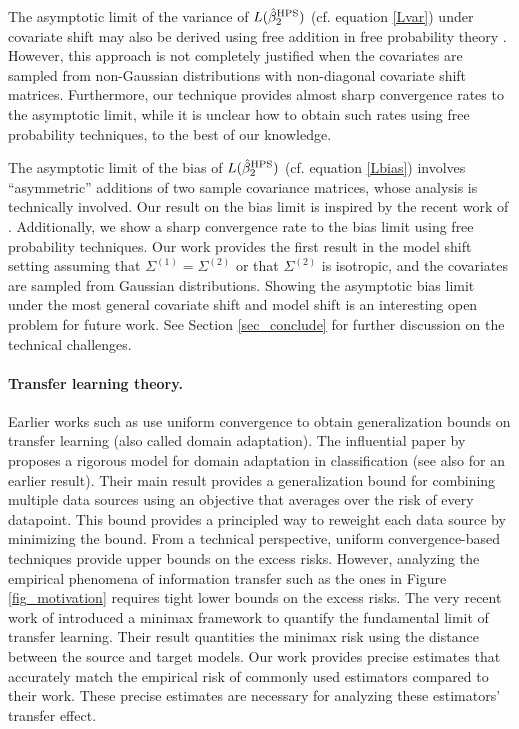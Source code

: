 The asymptotic limit of the variance of $L(\hat{\beta}_2^{\textup{HPS}})$ (cf. equation \eqref{Lvar}) under covariate shift may also be derived using free addition in free probability theory \cite{nica2006lectures}.
However, this approach is not completely justified when the covariates are sampled from non-Gaussian distributions with non-diagonal covariate shift matrices. 
Furthermore, our technique provides almost sharp convergence rates to the asymptotic limit, while it is unclear how to obtain such rates using free probability techniques, to the best of our knowledge.

The asymptotic limit of the bias of $L(\hat{\beta}_2^{\textup{HPS}})$ (cf. equation \eqref{Lbias}) involves ``asymmetric'' additions of two sample covariance matrices, whose analysis is technically involved.
Our result on the bias limit is inspired by the recent work of \citet{BES_free1,BES_free2}.
Additionally, we show a sharp convergence rate to the bias limit using free probability techniques.
Our work provides the first result in the model shift setting assuming that $\Sigma^{(1)} = \Sigma^{(2)}$ or that $\Sigma^{(2)}$ is isotropic, and the covariates are sampled from Gaussian distributions.
Showing the asymptotic bias limit under the most general covariate shift and model shift is an interesting open problem for future work.
See Section \ref{sec_conclude} for further discussion on the technical challenges.

\paragraph{Transfer learning theory.}
Earlier works such as \citet{B00,BS03,M06} use uniform convergence to obtain generalization bounds on transfer learning (also called domain adaptation).
The influential paper by \citet{BBCK10} proposes a rigorous model for domain adaptation in classification (see also \citet{crammer2008learning} for an earlier result).
Their main result provides a generalization bound for combining multiple data sources using an objective that averages over the risk of every datapoint.
This bound provides a principled way to reweight each data source by minimizing the bound.
From a technical perspective, uniform convergence-based techniques provide upper bounds on the excess risks.
However, analyzing the empirical phenomena of information transfer such as the ones in Figure \ref{fig_motivation} requires tight lower bounds on the excess risks.
The very recent work of \citet{mousavi2020minimax} introduced a minimax framework to quantify the fundamental limit of transfer learning.
Their result quantities the minimax risk using the distance between the source and target models.
Our work provides precise estimates that accurately match the empirical risk of commonly used estimators compared to their work.
These precise estimates are necessary for analyzing these estimators' transfer effect.

